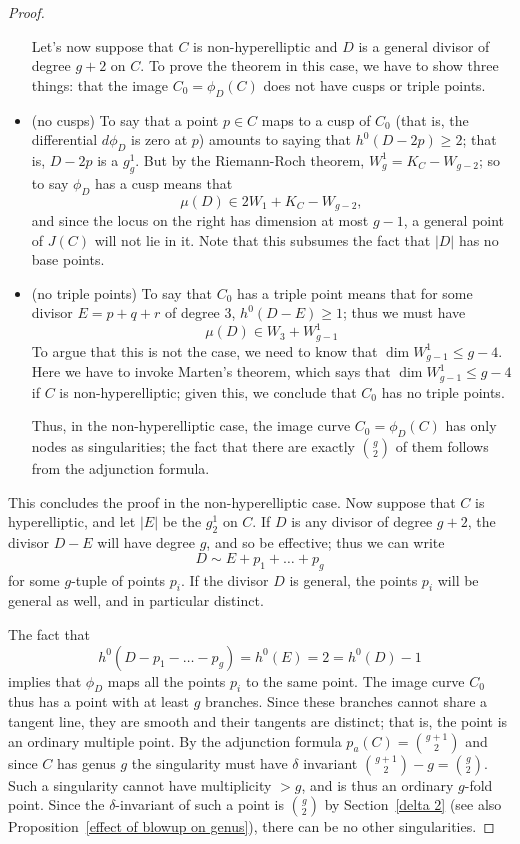 \begin{proof}
\begin{itemize}
Let's now suppose that $C$ is non-hyperelliptic and $D$ is a general divisor of degree $g+2$ on $C$. To prove the theorem in this case, we have to show  three things: that the image $C_0 = \phi_D(C)$ does not have cusps or triple points.

\item (no cusps) To say that a point $p \in C$ maps to a cusp of $C_0$ (that is, the differential $d\phi_D$ is zero at $p$) amounts to saying that $h^0(D-2p) \geq 2$; that is, $D-2p$ is a $g^1_g$. But by the Riemann-Roch theorem, $W^1_g = K_C - W_{g-2}$; so to say $\phi_D$ has a cusp means that
$$
\mu(D) \in 2W_1 + K_C - W_{g-2},
$$
and since the locus on the right has dimension at most $g-1$, a general point of $J(C)$ will not lie in it. Note that this subsumes the fact that $|D|$ has no base points.

\item (no triple points) To say that $C_0$ has a triple point means that for some divisor $E = p+q+r$ of degree 3, $h^0(D-E) \geq 1$; thus we must have 
$$
\mu(D) \in W_3 + W^1_{g-1}
$$
To argue that this is not the case, we need to know that $\dim W^1_{g-1} \leq g-4$. Here we have to invoke Marten's theorem, which says that $\dim W^1_{g-1} \leq g-4$ if $C$ is non-hyperelliptic; given this, we conclude that $C_0$ has no triple points.


Thus, in the non-hyperelliptic case, the image curve $C_0 = \phi_D(C)$ has only nodes as singularities; the fact that there are exactly $\binom{g}{2}$ of them follows from the adjunction formula.
\end{itemize}

\noindent This concludes the proof in the non-hyperelliptic case. Now suppose that $C$ is hyperelliptic, and let $|E|$ be the  $g^1_2$ on $C$. If  $D$ is any divisor of degree $g+2$, the divisor $D - E$ will have degree $g$, and so be effective; thus we can write
$$
D \sim E + p_1 + \dots + p_g
$$
for some $g$-tuple of points $p_i$. If the divisor $D$ is general, the points $p_i$ will be general as well, and in particular distinct.

The fact that
$$
h^0(D - p_1 - \dots - p_g) = h^0(E) = 2 = h^0(D) - 1
$$
implies that $\phi_D$ maps all the points $p_i$ to the same point. The image curve $C_0$ thus has a point with at least $g$ branches. Since these branches cannot share a tangent line,
they are smooth and their tangents are distinct; that is, the point is an ordinary multiple point. By the adjunction
formula $p_a(C) = \binom{g+1}{2}$ and since $C$ has genus $g$ the singularity must have $\delta$ invariant
$\binom{g+1}{2} -g = \binom{g}{2}$. Such a singularity cannot have multiplicity $>g$, and is thus an ordinary $g$-fold point. Since the $\delta$-invariant of such a point is $\binom{g}{2}$ by Section~\ref{delta 2} (see also
Proposition~\ref{effect of blowup on genus}), there can be no other singularities.
\end{proof}








